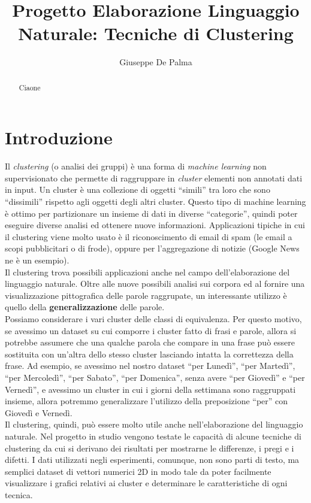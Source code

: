 \documentclass{llncs}
\author{Giuseppe De Palma}
\title{Progetto Elaborazione Linguaggio Naturale: Tecniche di Clustering}
\institute{Alma Mater Studiorum - Università di Bologna \\
	\email{giuseppe.depalma@studio.unibo.it}\\
	\email{Matricola: 854846}
}
\newcommand{\acapo}{\vspace{0.5\baselineskip}\\}
\begin{document}
    \maketitle
	
	\begin{abstract}
		Ciaone
	\end{abstract}
	   
	\section{Introduzione}
	Il \textit{clustering} (o analisi dei gruppi) è una forma di \textit{machine learning} non supervisionato che permette di raggruppare in \textit{cluster} elementi non annotati
	dati in input. Un cluster è una collezione di oggetti ``simili'' tra loro che sono ``dissimili'' rispetto agli oggetti degli altri cluster. Questo tipo di machine learning è
	ottimo per partizionare un insieme di dati in diverse ``categorie'', quindi poter eseguire diverse analisi ed ottenere nuove informazioni.
	Applicazioni tipiche in cui il clustering viene molto usato è il riconoscimento di email di spam (le email a scopi pubblicitari o di frode), oppure per l'aggregazione di notizie (Google News ne è un esempio).
	\acapo
	Il clustering trova possibili applicazioni anche nel campo dell'elaborazione del linguaggio naturale. Oltre alle nuove possibili analisi
	sui corpora ed al fornire una visualizzazione pittografica delle parole raggrupate, un interessante utilizzo è quello della \textbf{generalizzazione} delle parole.
	\acapo 
	Possiamo considerare i vari cluster delle classi di equivalenza. Per questo motivo, se avessimo un dataset su cui comporre i cluster fatto di frasi e parole, allora si potrebbe assumere che una
	qualche parola che compare in una frase può essere sostituita con un'altra dello stesso cluster lasciando intatta la correttezza della frase. 
	Ad esempio, se avessimo nel nostro dataset ``per Lunedì'', ``per Martedì'', ``per Mercoledì'', ``per Sabato'', ``per Domenica'', senza avere ``per Giovedì'' e ``per Vernedì'', e avessimo un cluster in cui 
	i giorni della settimana sono raggruppati insieme, allora potremmo generalizzare l'utilizzo della preposizione ``per'' con Giovedì e Vernedì.
	\acapo
	Il clustering, quindi, può essere molto utile anche nell'elaborazione del linguaggio naturale. Nel progetto in studio vengono testate le capacità di alcune tecniche di clustering
	da cui si derivano dei risultati per mostrarne le differenze, i pregi e i difetti. I dati utilizzati negli esperimenti, comunque, non sono parti di testo, ma semplici dataset di vettori numerici 2D in modo tale da poter facilmente 
	visualizzare i grafici relativi ai cluster e determinare le caratteristiche di ogni tecnica.
\end{document}
